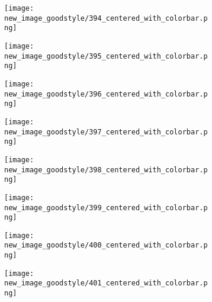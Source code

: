 \documentclass[a4paper,12pt]{article}
\begin{document}
\begin{figure}[H]
  \begin{subfigure}{0.11\textwidth}
    \texttt{[image: new\_image\_goodstyle/394\_centered\_with\_colorbar.png]}
  \end{subfigure}
  \hfill
  \begin{subfigure}{0.11\textwidth}
    \texttt{[image: new\_image\_goodstyle/395\_centered\_with\_colorbar.png]}
  \end{subfigure}
  \hfill
  \begin{subfigure}{0.11\textwidth}
    \texttt{[image: new\_image\_goodstyle/396\_centered\_with\_colorbar.png]}
  \end{subfigure}
  \hfill
  \begin{subfigure}{0.11\textwidth}
    \texttt{[image: new\_image\_goodstyle/397\_centered\_with\_colorbar.png]}
  \end{subfigure}
  \hfill
  \begin{subfigure}{0.11\textwidth}
    \texttt{[image: new\_image\_goodstyle/398\_centered\_with\_colorbar.png]}
  \end{subfigure}
  \hfill
  \begin{subfigure}{0.11\textwidth}
    \texttt{[image: new\_image\_goodstyle/399\_centered\_with\_colorbar.png]}
  \end{subfigure}
  \hfill
  \begin{subfigure}{0.11\textwidth}
    \texttt{[image: new\_image\_goodstyle/400\_centered\_with\_colorbar.png]}
  \end{subfigure}
  \hfill
  \begin{subfigure}{0.11\textwidth}
    \texttt{[image: new\_image\_goodstyle/401\_centered\_with\_colorbar.png]}
  \end{subfigure}
  \hfill
\end{figure}
\end{document}
